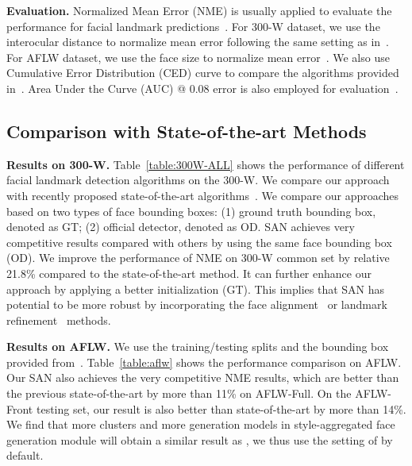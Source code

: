 \documentclass[10pt,twocolumn,letterpaper]{article}
\begin{document}
\textbf{Evaluation.}
Normalized Mean Error (NME) is usually applied to evaluate the performance for facial landmark predictions~\cite{lv2017deep,ren2016face,zhu2016unconstrained}.
For 300-W dataset, we use the interocular distance to normalize mean error following the same setting as in~\cite{sagonas2013300,lv2017deep,cao2014face,ren2016face}.
For AFLW dataset, we use the face size to normalize mean error~\cite{lv2017deep}.
We also use Cumulative Error Distribution (CED) curve to compare the algorithms provided in~\cite{sagonas2016300}.
Area Under the Curve (AUC) @ 0.08 error is also employed for evaluation~\cite{bulat2017far,trigeorgis2016mnemonic}.



\subsection{Comparison with State-of-the-art Methods}\label{sec:compare}

{\bf Results on 300-W.}
Table~\ref{table:300W-ALL} shows the performance of different facial landmark detection algorithms on the 300-W.
We compare our approach with recently proposed state-of-the-art algorithms~\cite{lv2017deep,xiao2017recurrent,jourabloo2017pose}.
We compare our approaches based on two types of face bounding boxes:
(1) ground truth bounding box, denoted as GT; (2) official detector, denoted as OD.
SAN achieves very competitive results compared with others by using the same face bounding box (OD).
We improve the performance of NME on 300-W common set by relative 21.8\% compared to the state-of-the-art method.
It can further enhance our approach by applying a better initialization (GT).
This implies that SAN has potential to be more robust by incorporating the face alignment~\cite{lv2017deep} or landmark refinement~\cite{zhu2016unconstrained,trigeorgis2016mnemonic} methods.


{\bf Results on AFLW.}
We use the training/testing splits and the bounding box provided from~\cite{zhu2016unconstrained,zhu2015face}.
Table~\ref{table:aflw} shows the performance comparison on AFLW.
Our SAN also achieves the very competitive NME results, which are better than the previous state-of-the-art by more than 11\% on AFLW-Full.
On the AFLW-Front testing set, our result is also better than state-of-the-art by more than 14\%.
We find that more clusters and more generation models in style-aggregated face generation module will obtain a similar result as , we thus use the setting of  by default. 
\end{document}

